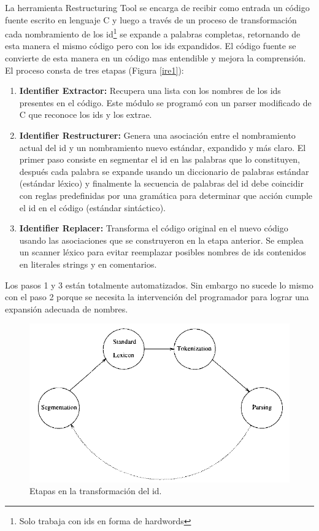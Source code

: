 \documentclass[12pt]{report}
\begin{document}
La herramienta Restructuring Tool\cite{BCPT00} se encarga de recibir como entrada un código fuente escrito en lenguaje C y luego a través de un proceso de transformación cada nombramiento de los id\footnote[1]{Solo trabaja con ids en forma de hardwords} se expande a palabras completas, retornando de esta manera el mismo código pero con los ids expandidos.
El código fuente se convierte de esta manera en un código mas entendible y mejora la comprensión. El proceso consta de tres etapas (Figura \ref{ire1}): 

\begin{enumerate}
\itemsep0em%
\item \textbf{Identifier Extractor:} Recupera una lista con los nombres de los ids presentes en el código. Este módulo se programó con un parser modificado de C que reconoce los ids y los extrae.
\item \textbf{Identifier Restructurer:} Genera una asociación entre el nombramiento actual del id y un nombramiento nuevo estándar, expandido y más claro. El primer paso consiste en segmentar el id en las palabras que lo constituyen, después cada palabra se expande usando un diccionario de palabras estándar (estándar léxico) y finalmente la secuencia de palabras del id debe coincidir con reglas predefinidas por una gramática para determinar que acción cumple el id en el código (estándar sintáctico).
\item \textbf{Identifier Replacer:} Transforma el código original en el nuevo código usando las asociaciones que se construyeron en la etapa anterior. Se emplea un scanner léxico para evitar reemplazar posibles nombres de ids contenidos en literales strings y en comentarios.
\end{enumerate}

Los pasos 1 y 3 están totalmente automatizados. Sin embargo no sucede lo mismo con el paso 2 porque se necesita la intervención del programador para lograr una expansión adecuada de nombres.

\begin{figure}[h] %
\centering
\includegraphics[scale= 0.60]{./ire_2.png}
\caption{Etapas en la transformación del id.}
\label{ire2}
\end{figure}
\end{document}
